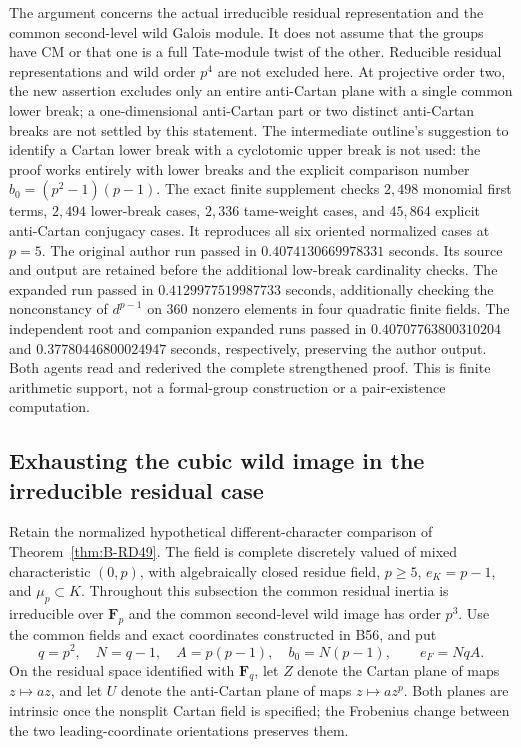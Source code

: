 \begin{remark}
\label{rem:B-RD56-scope}
The argument concerns the actual irreducible residual representation
and the common second-level wild Galois module. It does not assume
that the groups have CM or that one is a full Tate-module twist of
the other. Reducible residual representations and wild order $p^4$ are not
excluded here. At projective order two, the new assertion excludes
only an entire anti-Cartan plane with a single common lower break;
a one-dimensional anti-Cartan part or two distinct anti-Cartan
breaks are not settled by this statement. The intermediate outline's
suggestion to identify a Cartan lower break with a cyclotomic upper
break is not used: the proof works entirely with lower breaks and the
explicit comparison number $b_0=(p^2-1)(p-1)$.
The exact finite supplement
checks $2{,}498$ monomial first terms, $2{,}494$ lower-break cases,
$2{,}336$ tame-weight cases, and $45{,}864$ explicit anti-Cartan
conjugacy cases. It reproduces all six oriented normalized cases
at $p=5$. The original author run passed in $0.4074130669978331$ seconds.
Its source and output are retained before the additional low-break
cardinality checks. The expanded run passed in
$0.4129977519987733$ seconds, additionally checking the nonconstancy
of $d^{p-1}$ on $360$ nonzero elements in four quadratic finite fields.
The independent root and companion expanded runs passed in
$0.40707763800310204$ and $0.37780446800024947$ seconds,
respectively, preserving the author output. Both agents read and
rederived the complete strengthened proof. This is finite arithmetic
support, not a formal-group construction or a pair-existence computation.
\end{remark}


\subsection{Exhausting the cubic wild image in the irreducible residual case}

Retain the normalized hypothetical different-character comparison of
Theorem~\ref{thm:B-RD49}. The field is complete discretely valued of
mixed characteristic $(0,p)$, with algebraically closed residue field,
$p\ge5$, $e_K=p-1$, and $\mu_p\subset K$. Throughout this subsection
the common residual inertia is irreducible over $\mathbf F_p$ and the
common second-level wild image has order $p^3$. Use the common fields
and exact coordinates constructed in B56, and put
\[
 q=p^2,\quad N=q-1,\quad A=p(p-1),\quad b_0=N(p-1),
 \qquad e_F=NqA.
\]
On the residual space identified with $\mathbf F_q$, let $Z$ denote
the Cartan plane of maps $z\mapsto az$, and let $U$ denote the
anti-Cartan plane of maps $z\mapsto az^p$. Both planes are intrinsic
once the nonsplit Cartan field is specified; the Frobenius change
between the two leading-coordinate orientations preserves them.

